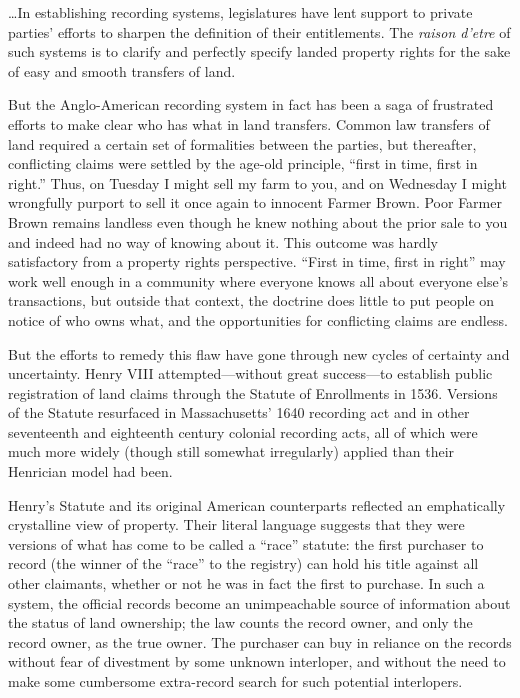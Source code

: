 

\ldots In establishing recording systems, legislatures have lent
support to private parties' efforts to sharpen the definition of their
entitlements. The \textit{raison d'etre} of such systems is to clarify and
perfectly specify landed property rights for the sake of easy and smooth
transfers of land.

But the Anglo-American recording system in fact has been a saga of frustrated
efforts to make clear who has what in land transfers. Common law transfers of
land required a certain set of formalities between the parties, but thereafter,
conflicting claims were settled by the age-old principle, ``first in time, first
in right.'' Thus, on Tuesday I might sell my farm to you, and on Wednesday I
might wrongfully purport to sell it once again to innocent Farmer Brown. Poor
Farmer Brown remains landless even though he knew nothing about the prior sale
to you and indeed had no way of knowing about it. This outcome was hardly
satisfactory from a property rights perspective. ``First in time, first in
right'' may work well enough in a community where everyone knows all about
everyone else's transactions, but outside that context, the doctrine does
little to put people on notice of who owns what, and the opportunities for
conflicting claims are endless.

But the efforts to remedy this flaw have gone through new cycles of certainty
and uncertainty. Henry VIII attempted---without great success---to establish
public registration of land claims through the Statute of Enrollments in 1536.
Versions of the Statute resurfaced in Massachusetts' 1640 recording act and in
other seventeenth and eighteenth century colonial recording acts, all of which
were much more widely (though still somewhat irregularly) applied than their
Henrician model had been.

Henry's Statute and its original American counterparts reflected an
emphatically crystalline view of property. Their literal language suggests that
they were versions of what has come to be called a ``race'' statute: the first
purchaser to record (the winner of the ``race'' to the registry) can hold his
title against all other claimants, whether or not he was in fact the first to
purchase. In such a system, the official records become an unimpeachable source
of information about the status of land ownership; the law counts the record
owner, and only the record owner, as the true owner. The purchaser can buy in
reliance on the records without fear of divestment by some unknown interloper,
and without the need to make some cumbersome extra-record search for such
potential interlopers.

